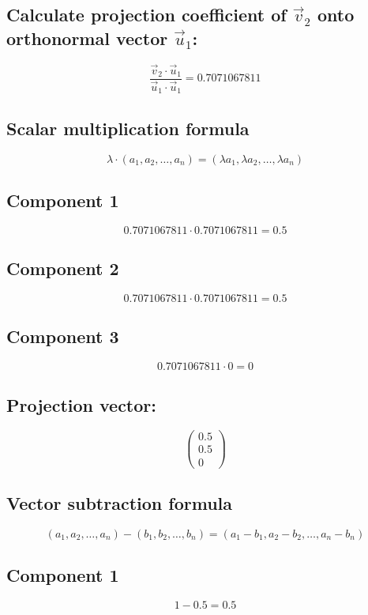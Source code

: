 \documentclass{article}
\begin{document}
\subsection*{ \vspace{1em} Calculate projection coefficient of \(\vec{v}_{2}\) onto orthonormal vector \(\vec{u}_{1}\):}
\[
\frac{\vec{v}_{2} \cdot \vec{u}_{1}}{\vec{u}_{1} \cdot \vec{u}_{1}} = 0.7071067811
\]
\subsection*{ \vspace{1em} Scalar multiplication formula}
\[
\lambda \cdot (a_1, a_2, \dots, a_n) = (\lambda a_1, \lambda a_2, \dots, \lambda a_n)
\]
\subsection*{ \vspace{1em} Component 1}
\[
0.7071067811 \cdot 0.7071067811 = 0.5
\]
\subsection*{ \vspace{1em} Component 2}
\[
0.7071067811 \cdot 0.7071067811 = 0.5
\]
\subsection*{ \vspace{1em} Component 3}
\[
0.7071067811 \cdot 0 = 0
\]
\subsection*{ \vspace{1em} Projection vector:}
\[
\begin{pmatrix}0.5 \\ 0.5 \\ 0\end{pmatrix}
\]
\subsection*{ \vspace{1em} Vector subtraction formula}
\[
(a_1, a_2, \dots, a_n) - (b_1, b_2, \dots, b_n) = (a_1 - b_1, a_2 - b_2, \dots, a_n - b_n)
\]
\subsection*{ \vspace{1em} Component 1}
\[
1 - 0.5 = 0.5
\]
\end{document}
